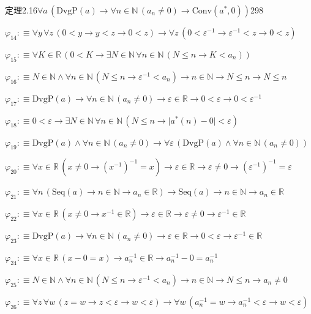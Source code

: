 \begin{fullproof}{定理2.16}{$\forall a\,(\mathrm{DvgP}(a) \to \forall n \in \mathbb{N}\,(a_{n} \neq 0) \to \mathrm{Conv}(a^{\ast},0))$}{298}
\begin{abbrevlist}
\item $\varphi_{14} :\equiv \forall y\,\forall z\,(0 < y \to y < z \to 0 < z) \to \forall z\,(0 < \varepsilon^{-1} \to \varepsilon^{-1} < z \to 0 < z)$
\item $\varphi_{15} :\equiv \forall K \in \mathbb{R}\,(0 < K \to \exists N \in \mathbb{N}\,\forall n \in \mathbb{N}\,(N \leq n \to K < a_{n}))$
\item $\varphi_{16} :\equiv N \in \mathbb{N} \land \forall n \in \mathbb{N}\,(N \leq n \to \varepsilon^{-1} < a_{n}) \to n \in \mathbb{N} \to N \leq n \to N \leq n$
\item $\varphi_{17} :\equiv \mathrm{DvgP}(a) \to \forall n \in \mathbb{N}\,(a_{n} \neq 0) \to \varepsilon \in \mathbb{R} \to 0 < \varepsilon \to 0 < \varepsilon^{-1}$
\item $\varphi_{18} :\equiv 0 < \varepsilon \to \exists N \in \mathbb{N}\,\forall n \in \mathbb{N}\,(N \leq n \to \lvert a^{\ast}(n) - 0 \rvert < \varepsilon)$
\item $\varphi_{19} :\equiv \mathrm{DvgP}(a) \land \forall n \in \mathbb{N}\,(a_{n} \neq 0) \to \forall \varepsilon\,(\mathrm{DvgP}(a) \land \forall n \in \mathbb{N}\,(a_{n} \neq 0))$
\item $\varphi_{20} :\equiv \forall x \in \mathbb{R}\,(x \neq 0 \to (x^{-1})^{-1} = x) \to \varepsilon \in \mathbb{R} \to \varepsilon \neq 0 \to (\varepsilon^{-1})^{-1} = \varepsilon$
\item $\varphi_{21} :\equiv \forall n\,(\mathrm{Seq}(a) \to n \in \mathbb{N} \to a_{n} \in \mathbb{R}) \to \mathrm{Seq}(a) \to n \in \mathbb{N} \to a_{n} \in \mathbb{R}$
\item $\varphi_{22} :\equiv \forall x \in \mathbb{R}\,(x \neq 0 \to x^{-1} \in \mathbb{R}) \to \varepsilon \in \mathbb{R} \to \varepsilon \neq 0 \to \varepsilon^{-1} \in \mathbb{R}$
\item $\varphi_{23} :\equiv \mathrm{DvgP}(a) \to \forall n \in \mathbb{N}\,(a_{n} \neq 0) \to \varepsilon \in \mathbb{R} \to 0 < \varepsilon \to \varepsilon^{-1} \in \mathbb{R}$
\item $\varphi_{24} :\equiv \forall x \in \mathbb{R}\,(x - 0 = x) \to a_{n}^{-1} \in \mathbb{R} \to a_{n}^{-1} - 0 = a_{n}^{-1}$
\item $\varphi_{25} :\equiv N \in \mathbb{N} \land \forall n \in \mathbb{N}\,(N \leq n \to \varepsilon^{-1} < a_{n}) \to n \in \mathbb{N} \to N \leq n \to a_{n} \neq 0$
\item $\varphi_{26} :\equiv \forall z\,\forall w\,(z = w \to z < \varepsilon \to w < \varepsilon) \to \forall w\,(a_{n}^{-1} = w \to a_{n}^{-1} < \varepsilon \to w < \varepsilon)$

\end{abbrevlist}
\end{fullproof}

